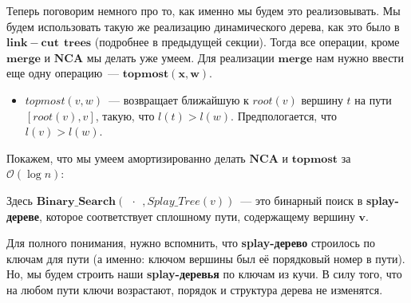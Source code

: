     Теперь поговорим немного про то, как именно мы будем это реализовывать. Мы будем использовать такую же реализацию динамического дерева, как это было в $\mathbf{link-cut\:\:trees}$ (подробнее в предыдущей секции). Тогда все операции, кроме $\mathbf{merge}$ и $\mathbf{NCA}$ мы делать уже умеем. Для реализации $\mathbf{merge}$ нам нужно ввести еще одну операцию~--- $\mathbf{topmost(x, w)}.$
    \begin{itemize}
        \item $topmost(v, w)$~--- возвращает ближайшую к $root(v)$ вершину $t$ на пути $[root(v), v]$, такую, что $l(t) > l(w).$ Предпологается, что $l(v) > l(w).$
    \end{itemize}
    
    Покажем, что мы умеем амортизированно делать $\mathbf{NCA}$ и $\mathbf{topmost}$ за $\mathcal{O}(\log{n}):$
    \begin{algorithmic}[1]
        \State{}
    \EndProcedure
    \end{algorithmic}
    \begin{algorithmic}[1]
        \State{}
    \EndProcedure
    \end{algorithmic}
    
    Здесь $\mathbf{Binary\_Search}(\:\:\cdot\:\:,Splay\_Tree(v))$~--- это бинарный поиск в \textbf{splay-дереве}, которое соответствует сплошному пути, содержащему вершину $\mathbf{v}.$ 
    
    Для полного понимания, нужно вспомнить, что \textbf{splay-дерево} строилось по \guillemotright$\:\:$ ключам для пути (а именно: ключом вершины был её порядковый номер в пути). Но, мы будем строить наши \textbf{splay-деревья} по ключам из кучи. В силу того, что на любом пути ключи возрастают, порядок и структура дерева не изменятся.
    
